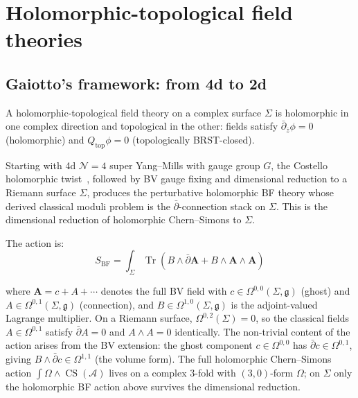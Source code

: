 \section{Holomorphic-topological field theories}

\subsection{Gaiotto's framework: from 4d to 2d}

\begin{definition}
A holomorphic-topological field theory on a complex surface $\Sigma$ is holomorphic in one complex direction and topological in the other: fields satisfy $\bar{\partial}_{\bar{z}} \phi = 0$ (holomorphic) and $Q_{\text{top}} \phi = 0$ (topologically BRST-closed).
\end{definition}

\begin{theorem}[HT theory from 4d \texorpdfstring{$\mathcal{N}=4$}{N=4} SYM;
\ClaimStatusConditional; licensing $\alpha+\gamma$ via the Costello
holomorphic-twist datum, BV gauge fixing, dimensional reduction, and
$\hypKMHTBV$]
Starting with 4d $\mathcal{N}=4$ super Yang--Mills with gauge group
$G$, the Costello holomorphic twist~\cite{costello-gaiotto}, followed
by BV gauge fixing and dimensional reduction to a Riemann surface
\(\Sigma\), produces the perturbative holomorphic BF theory whose
derived classical moduli problem is the \(\bar\partial\)-connection
stack on \(\Sigma\).  This is the dimensional reduction of
holomorphic Chern--Simons to \(\Sigma\).

The action is:
\[S_{\text{BF}} = \int_{\Sigma} \operatorname{Tr}\!\left(B \wedge \bar{\partial} \mathbf{A} + B \wedge \mathbf{A} \wedge \mathbf{A}\right)\]

where $\mathbf{A} = c + A + \cdots$ denotes the full BV field with $c \in \Omega^{0,0}(\Sigma, \mathfrak{g})$ (ghost) and $A \in \Omega^{0,1}(\Sigma, \mathfrak{g})$ (connection), and $B \in \Omega^{1,0}(\Sigma, \mathfrak{g})$ is the adjoint-valued Lagrange multiplier.
On a Riemann surface, $\Omega^{0,2}(\Sigma) = 0$, so the classical fields
$A \in \Omega^{0,1}$ satisfy $\bar{\partial}A = 0$ and $A \wedge A = 0$ identically. The non-trivial
content of the action arises from the BV extension: the ghost component $c \in \Omega^{0,0}$ has
$\bar{\partial}c \in \Omega^{0,1}$, giving $B \wedge \bar{\partial}c \in \Omega^{1,1}$ (the volume form).
The full holomorphic Chern--Simons action $\int \Omega \wedge \operatorname{CS}(\mathcal{A})$ lives on a
complex $3$-fold with $(3,0)$-form $\Omega$; on $\Sigma$ only the holomorphic BF action above survives the dimensional reduction.
\end{theorem}

